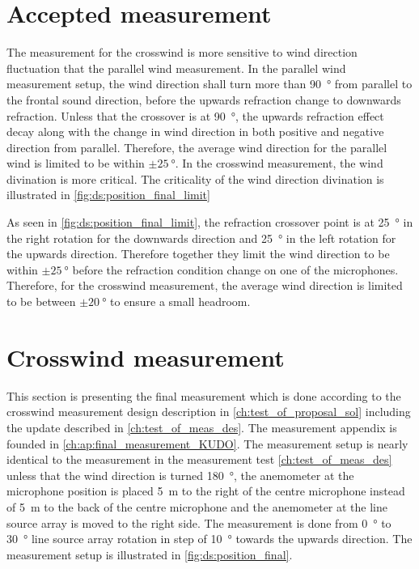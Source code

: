 \section{Accepted measurement}\label{meas:acc_measu}
The measurement for the crosswind is more sensitive to wind direction fluctuation that the parallel wind measurement. In the parallel wind measurement setup, the wind direction shall turn more than \SI{90}{\degree} from parallel to the frontal sound direction, before the upwards refraction change to downwards refraction. Unless that the crossover is at \SI{90}{\degree}, the upwards refraction effect decay along with the change in wind direction in both positive and negative direction from parallel. Therefore, the average wind direction for the parallel wind is limited to be within $\pm\SI{25}{\degree}$. In the crosswind measurement, the wind divination is more critical. The criticality of the wind direction divination is illustrated in \autoref{fig:ds:position_final_limit}


As seen in \autoref{fig:ds:position_final_limit}, the refraction crossover point is at \SI{25}{\degree} in the right rotation for the downwards direction and \SI{25}{\degree} in the left rotation for the upwards direction. Therefore together they limit the wind direction to be within $\pm\SI{25}{\degree}$ before the refraction condition change on one of the microphones. Therefore, for the crosswind measurement, the average wind direction is limited to be between $\pm\SI{20}{\degree}$ to ensure a small headroom. 


\section{Crosswind measurement}\label{mes:kudo:cross_mes}
This section is presenting the final measurement which is done according to the crosswind measurement design description in \autoref{ch:test_of_proposal_sol} including the update described in \autoref{ch:test_of_meas_des}. The measurement appendix is founded in \autoref{ch:ap:final_measurement_KUDO}. The measurement setup is nearly identical to the measurement in the measurement test \autoref{ch:test_of_meas_des} unless that the wind direction is turned \SI{180}{\degree}, the anemometer at the microphone position is placed \SI{5}{\meter} to the right of the centre microphone instead of \SI{5}{\meter} to the back of the centre microphone and the anemometer at the line source array is moved to the right side. The measurement is done from  \SI{0}{\degree} to  \SI{30}{\degree} line source array rotation in step of  \SI{10}{\degree} towards the upwards direction. The measurement setup is illustrated in \autoref{fig:ds:position_final}.

